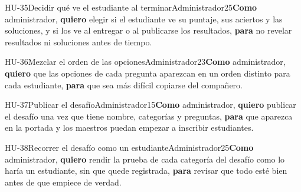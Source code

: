 \begin{historia}[1]{HU-35}{Decidir qué ve el estudiante al terminar}{Administrador}{2}{5}{\textbf{Como} administrador, \textbf{quiero} elegir si el estudiante ve su puntaje, sus aciertos y las soluciones, y si los ve al entregar o al publicarse los resultados, \textbf{para} no revelar resultados ni soluciones antes de tiempo.}
\end{historia}

\begin{historia}[1]{HU-36}{Mezclar el orden de las opciones}{Administrador}{2}{3}{\textbf{Como} administrador, \textbf{quiero} que las opciones de cada pregunta aparezcan en un orden distinto para cada estudiante, \textbf{para} que sea más difícil copiarse del compañero.}
\end{historia}

\begin{historia}[1]{HU-37}{Publicar el desafío}{Administrador}{1}{5}{\textbf{Como} administrador, \textbf{quiero} publicar el desafío una vez que tiene nombre, categorías y preguntas, \textbf{para} que aparezca en la portada y los maestros puedan empezar a inscribir estudiantes.}
\end{historia}

\begin{historia}[1]{HU-38}{Recorrer el desafío como un estudiante}{Administrador}{2}{5}{\textbf{Como} administrador, \textbf{quiero} rendir la prueba de cada categoría del desafío como lo haría un estudiante, sin que quede registrada, \textbf{para} revisar que todo esté bien antes de que empiece de verdad.}
\end{historia}


